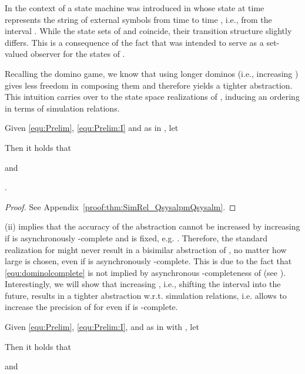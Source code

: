  \begin{remark}
 In the context of \SlA a state machine  was introduced in \cite{Raisch2010} whose state at time  represents the string of external symbols from time  to time , i.e., from the interval . While the state sets of   and  coincide, their transition structure slightly differs. This is a consequence of the fact that  was intended to serve as a set-valued observer for the states of .
\end{remark}
  
Recalling the domino game, we know that using longer dominos (i.e., increasing ) gives less freedom in composing them and therefore yields a tighter abstraction. This intuition carries over to the state space realizations of , inducing an ordering in terms of simulation relations. 

\begin{theorem}\label{thm:SimRel_QsysalpmQsysalm}
Given \eqref{equ:Prelim}, \eqref{equ:Prelim:I} and  as in , let

Then it holds that 
 \begin{compactenum}[(i)]
  \item  and 
  \item .
 \end{compactenum}
\end{theorem}

\begin{proof}
See Appendix~\ref{proof:thm:SimRel_QsysalpmQsysalm}. 
\end{proof}

 (ii) implies that the accuracy of the abstraction cannot be increased by increasing  if  is asynchronously -complete and  is fixed, e.g. . Therefore, the standard realization  for \SAlA might never result in a bisimilar abstraction of , no matter how large  is chosen, even if  is asynchronously -complete. This is due to the fact that 
\eqref{equ:dominolcomplete} is not implied by asynchronous -completeness of  (see ).\\
Interestingly, we will show that increasing , i.e., shifting the interval into the future, results in a tighter abstraction w.r.t. simulation relations, i.e. allows to increase the precision of  for  even if  is -complete. 


\begin{theorem}\label{thm:SimRel_QsysalmpQsysalm}
Given \eqref{equ:Prelim}, \eqref{equ:Prelim:I}, and  as in  with , let

Then it holds that
\begin{compactenum}[(i)]
 \item   and 
 \item \Qsyse\Ilmp\Qsysel\Ilm
\end{compactenum}
\end{theorem}


